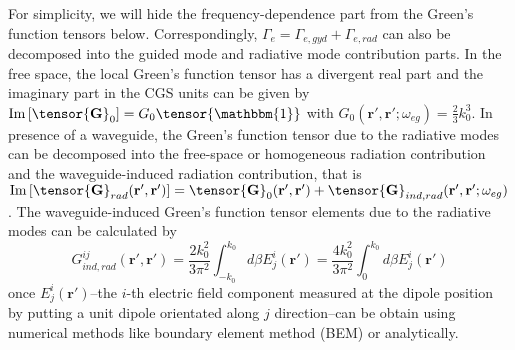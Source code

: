 \documentclass[pra,twocolumn,floatfix,superscriptaddress]{revtex4-1} %
\def\br{\mathbf{r}}
\begin{document}
\begin{appendix}
For simplicity, we will hide the frequency-dependence part from the Green's function tensors below.
Correspondingly, $ \Gamma_e=\Gamma_{e,gyd}+\Gamma_{e,rad} $ can also be decomposed into the guided mode and radiative mode contribution parts. 
In the free space, the local Green's function tensor has a divergent real part and the imaginary part in the CGS units can be given by 
$\mathrm{Im}\left[\tensor{\mathbf{G}}_0\right]=G_0\tensor{\mathbbm{1}}$ with $G_0(\mathbf{r}',\mathbf{r}';\omega_{eg})=\frac{2}{3}k_0^3$.
In presence of a waveguide, the Green's function tensor due to the radiative modes can be decomposed into the free-space or homogeneous radiation contribution and the waveguide-induced radiation contribution, that is $ \mathrm{Im}\left[\tensor{\mathbf{G}}_{rad}(\br',\br')\right]=\tensor{\mathbf{G}}_0(\br',\br')+\tensor{\mathbf{G}}_{ind,rad}(\br',\br';\omega_{eg}) $.
The waveguide-induced Green's function tensor elements due to the radiative modes can be calculated by
$$G_{ind,rad}^{ij}(\mathbf{r}',\mathbf{r}')=\frac{2k_0^2}{3\pi^2}\int_{-k_0}^{k_0} d\beta E_j^i(\mathbf{r}')=\frac{4k_0^2}{3\pi^2}\int_{0}^{k_0} d\beta E_j^i(\mathbf{r}')$$
once $ E_j^i(\mathbf{r}') $--the $i$-th electric field component measured at the dipole position by putting a unit dipole orientated along $j$ direction--can be obtain using numerical methods like boundary element method (BEM) or analytically.


\end{appendix}
\end{document}
